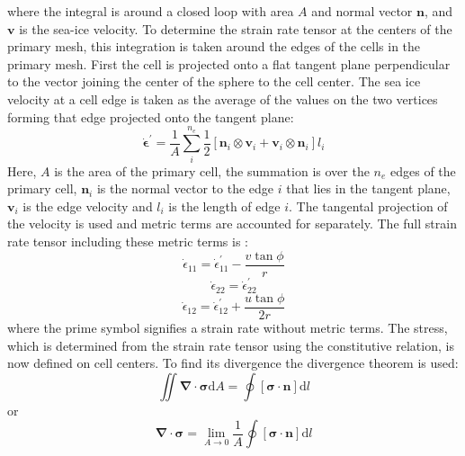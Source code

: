 where the integral is around a closed loop with area $A$ and normal vector $\boldsymbol{n}$, and $\boldsymbol{v}$ is the sea-ice velocity.
To determine the strain rate tensor at the centers of the primary mesh, this integration is taken around the edges of the cells in the primary mesh. First the cell is projected onto a flat tangent plane perpendicular to the vector joining the center of the sphere to the cell center. The sea ice velocity at a cell edge is taken as the average of the values on the two vertices forming that edge projected onto the tangent plane:
\begin{equation}
\boldsymbol{\dot{\epsilon}}^\prime = \frac{1}{A} \sum_i^{n_e} \frac{1}{2} \left[ \boldsymbol{n}_i \otimes \boldsymbol{v}_i + \boldsymbol{v}_i \otimes \boldsymbol{n}_i \right] l_i
\end{equation}
Here, $A$ is the area of the primary cell, the summation is over the $n_e$ edges of the primary cell, $\boldsymbol{n}_i$ is the normal vector to the edge $i$ that lies in the tangent plane, $\boldsymbol{v}_i$ is the edge velocity and $l_i$ is the length of edge $i$. The tangental projection of the velocity is used and metric terms are accounted for separately. The full strain rate tensor including these metric terms is \citep{Batchelor67}:
\begin{equation}
\dot{\epsilon}_{11} = \dot{\epsilon}_{11}^\prime - \frac{v \tan{\phi}}{r}
\end{equation}
\begin{equation}
\dot{\epsilon}_{22} = \dot{\epsilon}_{22}^\prime
\end{equation}
\begin{equation}
\dot{\epsilon}_{12} = \dot{\epsilon}_{12}^\prime + \frac{u \tan{\phi}}{2r}
\end{equation}
where the prime symbol signifies a strain rate without metric terms.
The stress, which is determined from the strain rate tensor using the constitutive relation, is now defined on cell centers. To find its divergence the divergence theorem is used:
\begin{equation}
\iint \boldsymbol{\nabla} \cdot \boldsymbol{\sigma} \mathrm{d}A = \oint \left[ \boldsymbol{\sigma} \cdot \boldsymbol{n} \right] \mathrm{d}l
\end{equation}
or
\begin{equation}
\boldsymbol{\nabla} \cdot \boldsymbol{\sigma} = \lim_{A \to 0}  \frac{1}{A} \oint \left[ \boldsymbol{\sigma} \cdot \boldsymbol{n} \right] \mathrm{d}l
\end{equation}
